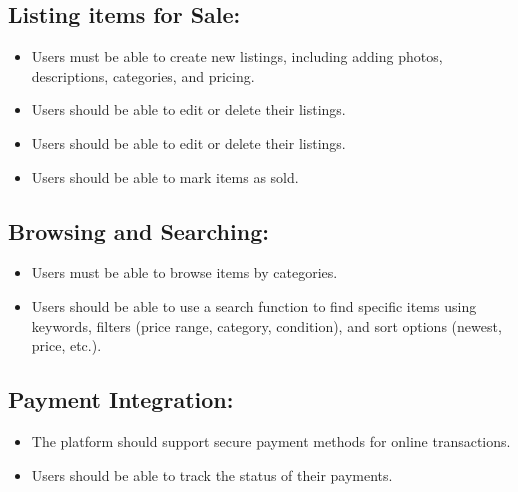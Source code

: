 \subsection{Listing items for Sale:}
\begin{itemize}
        \item Users must be able to create new listings, including adding photos, descriptions, categories, and pricing.
    
        \item Users should be able to edit or delete their listings.
        \item Users should be able to edit or delete their listings.
        \item Users should be able to mark items as sold.
\end{itemize}

\subsection{Browsing and Searching:}
\begin{itemize}
        \item Users must be able to browse items by categories.
        \item Users should be able to use a search function to find specific items using keywords, filters (price range, category, condition), and sort options (newest, price, etc.).
\end{itemize}

\subsection{Payment Integration:}
\begin{itemize}
        \item The platform should support secure payment methods for online transactions.
        \item Users should be able to track the status of their payments.
\end{itemize}


